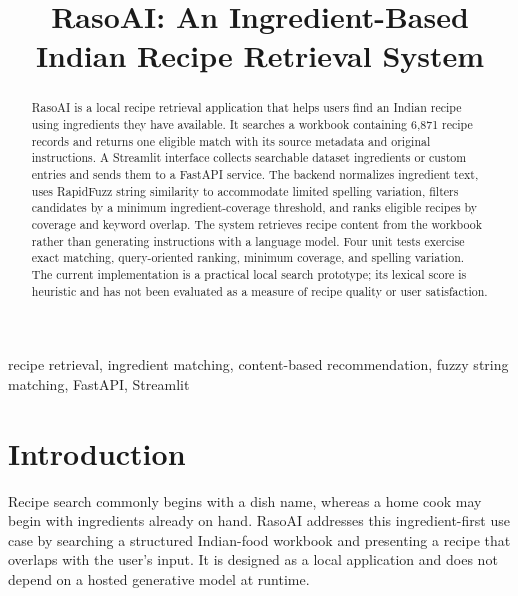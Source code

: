 \documentclass[conference]{IEEEtran}
\begin{document}
\title{RasoAI: An Ingredient-Based Indian Recipe Retrieval System}

\author{
}

\maketitle

\begin{abstract}
RasoAI is a local recipe retrieval application that helps users find an Indian recipe using ingredients they have available. It searches a workbook containing 6,871 recipe records and returns one eligible match with its source metadata and original instructions. A Streamlit interface collects searchable dataset ingredients or custom entries and sends them to a FastAPI service. The backend normalizes ingredient text, uses RapidFuzz string similarity to accommodate limited spelling variation, filters candidates by a minimum ingredient-coverage threshold, and ranks eligible recipes by coverage and keyword overlap. The system retrieves recipe content from the workbook rather than generating instructions with a language model. Four unit tests exercise exact matching, query-oriented ranking, minimum coverage, and spelling variation. The current implementation is a practical local search prototype; its lexical score is heuristic and has not been evaluated as a measure of recipe quality or user satisfaction.
\end{abstract}

\begin{IEEEkeywords}
recipe retrieval, ingredient matching, content-based recommendation, fuzzy string matching, FastAPI, Streamlit
\end{IEEEkeywords}

\section{Introduction}
Recipe search commonly begins with a dish name, whereas a home cook may begin with ingredients already on hand. RasoAI addresses this ingredient-first use case by searching a structured Indian-food workbook and presenting a recipe that overlaps with the user's input. It is designed as a local application and does not depend on a hosted generative model at runtime.
\end{document}
